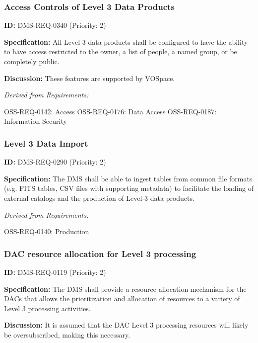 \documentclass[SE,toc,lsstdraft]{lsstdoc}
\begin{document}
\subsubsection{Access Controls of Level 3 Data Products}

\label{DMS-REQ-0340}
\textbf{ID:} DMS-REQ-0340 (Priority: 2)

\textbf{Specification:} All Level 3 data products shall be configured to have the ability to have access restricted to the owner, a list of people, a named group, or be completely public.

\textbf{Discussion:} These features are supported by VOSpace.

\emph{Derived from Requirements:}

OSS-REQ-0142:
Access \newline
OSS-REQ-0176:
Data Access \newline
OSS-REQ-0187:
Information Security \newline

\subsubsection{Level 3 Data Import}

\label{DMS-REQ-0290}
\textbf{ID:} DMS-REQ-0290 (Priority: 2)

\textbf{Specification:} The DMS shall be able to ingest tables from common file formats (e.g. FITS tables, CSV files with supporting metadata) to facilitate the loading of external catalogs and the production of Level-3 data products.

\emph{Derived from Requirements:}

OSS-REQ-0140:
Production \newline

\subsubsection{DAC resource allocation for Level 3 processing}

\label{DMS-REQ-0119}
\textbf{ID:} DMS-REQ-0119 (Priority: 2)

\textbf{Specification:} The DMS shall provide a resource allocation mechanism for the DACs that allows the prioritization and allocation of resources to a variety of Level 3 processing activities.

\textbf{Discussion:} It is assumed that the DAC Level 3 processing resources will likely be oversubscribed, making this necessary.
\end{document}
